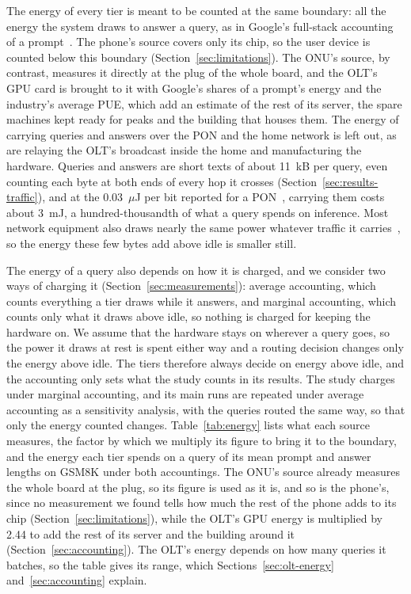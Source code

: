 \documentclass[cic,dipl,english]{infufrgs}
\begin{document}
The energy of every tier is meant to be counted at the same boundary: all the energy the
system draws to answer a query, as in Google's full-stack accounting of a
prompt~\cite{elsworth2025measuring}. The phone's source covers only its chip, so the user
device is counted below this boundary (Section~\ref{sec:limitations}). The ONU's source, by
contrast, measures it directly at the plug of the whole board, and the OLT's GPU card is
brought to it with Google's shares of a prompt's energy and the industry's average PUE,
which add an estimate of the rest of its server, the spare machines kept ready for peaks
and the building that houses them. The energy of carrying queries and answers over the PON
and the home network is left out, as are relaying the OLT's broadcast inside the home and
manufacturing the hardware. Queries and answers are short texts of about 11~kB per query, even
counting each byte at both ends of every hop it crosses (Section~\ref{sec:results-traffic}), and
at the 0.03~$\mu$J per bit reported for a PON~\cite{lorincz2025comprehensive}, carrying them costs
about 3~mJ, a hundred-thousandth of what a query spends on inference. Most network equipment also
draws nearly the same power whatever traffic it carries~\cite{krug2014understanding}, so the
energy these few bytes add above idle is smaller still.

The energy of a query also depends on how it is charged, and we consider two ways of
charging it (Section~\ref{sec:measurements}): average accounting, which counts everything a
tier draws while it answers, and marginal accounting, which counts only what it draws above idle, so
nothing is charged for keeping the hardware on. We assume that the hardware stays on wherever a
query goes, so the power it draws at rest is spent either way and a routing decision changes
only the energy above idle. The tiers therefore always decide on energy above idle, and
the accounting only sets what the study counts in its results. The study charges under marginal accounting, and its main runs are repeated under
average accounting as a sensitivity analysis, with the queries routed the same way, so that only
the energy counted changes. Table~\ref{tab:energy} lists
what each source measures, the factor by which we multiply its figure to bring it to the
boundary, and the energy each tier spends on a query of its mean prompt and answer lengths
on GSM8K under both accountings. The ONU's source already measures the whole board at the
plug, so its figure is used as it is, and so is the phone's, since no measurement we found
tells how much the rest of the phone adds to its chip (Section~\ref{sec:limitations}), while
the OLT's GPU energy is multiplied by 2.44 to add the rest of its server and the building
around it (Section~\ref{sec:accounting}). The OLT's energy depends on how many queries it batches, so the table gives its
range, which Sections~\ref{sec:olt-energy} and~\ref{sec:accounting} explain.
\end{document}
